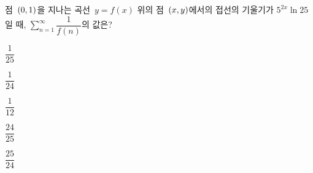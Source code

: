 점~$(0{,}\mkern3mu\mathopen{}1)$을 지나는 곡선~$y=f(x)$ 위의 점~$(x{,}\mkern3mu\mathopen{}y)$에서의 접선의 기울기가 $5^{2x}\ln 25$일 때, $\displaystyle\sum_{n=1}^{\infty}\dfrac{1}{f(n)}$의 값은?
\begin{choices32}{\rule[-3ex]{0pt}{8ex}$\dfrac{1}{25}$}{\rule[-3ex]{0pt}{8ex}$\dfrac{1}{24}$}{\rule[-3ex]{0pt}{8ex}$\dfrac{1}{12}$}{\rule[-3ex]{0pt}{8ex}$\dfrac{24}{25}$}{\rule[-3ex]{0pt}{8ex}$\dfrac{25}{24}$}\end{choices32}
